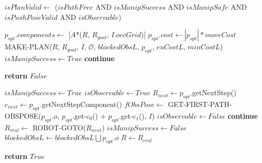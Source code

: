 \begin{algorithm}[H]
\begin{algorithmic}[1]
        \State $isPlanValid \gets$ ($isPathFree$ AND $isManipSuccess$ AND $isManipSafe$ AND $isPushPoseValid$ AND $isObservable$)

          \State $p_{opt}.components \gets$ [$A$*($R$, $R_{goal}$, $I.occGrid$)]
          \State $p_{opt}.cost \gets |p_{opt}| * moveCost$
        \EndIf
          \State MAKE-PLAN($R$, $R_{goal}$, $I$, $\mathcal{O}$, $blockedObsL$, $p_{opt}$, $euCostL$, $minCostL$)
          \State $isManipSuccess \gets True$
          \State \textbf{continue}
        \EndIf


  \end{algorithmic}
\end{algorithm}

\begin{algorithm}[H]

  \label{alg:07-custom-merge-makeandexecuteplan-part2}

  \begin{algorithmic}[1]


          \State \textbf{return} $False$
        \EndIf

        \State $isManipSuccess \gets True$
        \State $isObservable \gets True$
        \State $R_{next} \gets p_{opt}$.getNextStep()
        \State $c_{next} \gets p_{opt}$.getNextStepComponent()
          \State $fObsPose \gets$ GET-FIRST-PATH-OBSPOSE($p_{opt}.o$, $p_{opt}$.get-$c_{0}$() + $p_{opt}$.get-$c_{1}$(), $I$)
            \State $isObservable \gets False$
            \State \textbf{continue}
          \EndIf
        \EndIf
        \State $R_{real} \gets$ ROBOT-GOTO($R_{next}$)
          \State $isManipSuccess \gets False$
          \State $blockedObsL \gets blockedObsL \bigcup p_{opt}.o$
        \EndIf
        \State $R \gets R_{real}$

      \EndWhile

      \State \textbf{return} $True$

    \EndProcedure

  \end{algorithmic}
\end{algorithm}
